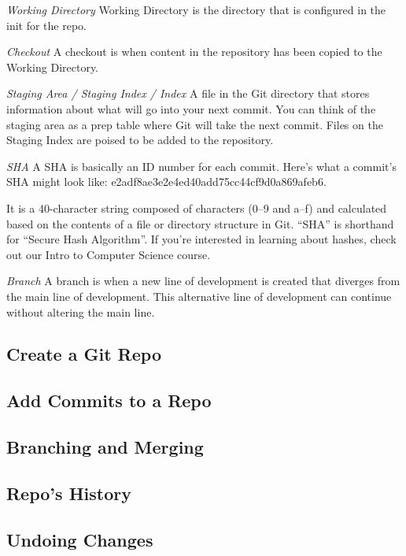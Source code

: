 \documentclass[
]{book}
\begin{document}
\emph{Working Directory}
Working Directory is the directory that is configured in the init for the repo.

\emph{Checkout}
A checkout is when content in the repository has been copied to the Working Directory.

\emph{Staging Area / Staging Index / Index}
A file in the Git directory that stores information about what will go into your next commit. You can think of the staging area as a prep table where Git will take the next commit. Files on the Staging Index are poised to be added to the repository.

\emph{SHA}
A SHA is basically an ID number for each commit. Here's what a commit's SHA might look like: e2adf8ae3e2e4ed40add75cc44cf9d0a869afeb6.

It is a 40-character string composed of characters (0--9 and a--f) and calculated based on the contents of a file or directory structure in Git. ``SHA'' is shorthand for ``Secure Hash Algorithm''. If you're interested in learning about hashes, check out our Intro to Computer Science course.

\emph{Branch}
A branch is when a new line of development is created that diverges from the main line of development. This alternative line of development can continue without altering the main line.

\hypertarget{create-a-git-repo}{%
\subsection{Create a Git Repo}\label{create-a-git-repo}}

\hypertarget{add-commits-to-a-repo}{%
\subsection{Add Commits to a Repo}\label{add-commits-to-a-repo}}

\hypertarget{branching-and-merging}{%
\subsection{Branching and Merging}\label{branching-and-merging}}

\hypertarget{repos-history}{%
\subsection{Repo's History}\label{repos-history}}

\hypertarget{undoing-changes}{%
\subsection{Undoing Changes}\label{undoing-changes}}
\end{document}
